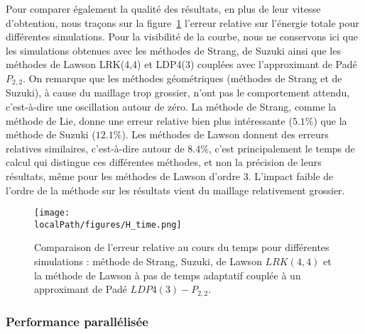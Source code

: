 Pour comparer également la qualité des résultats, en plus de leur vitesse d'obtention, nous traçons sur la figure~\ref{fig:3:H_time} l'erreur relative sur l'énergie totale pour différentes simulations. Pour la visibilité de la courbe, nous ne conservons ici que les simulations obtenues avec les méthodes de Strang, de Suzuki ainsi que les méthodes de Lawson LRK(4,4) et LDP4(3) couplées avec l'approximant de Padé $P_{2,2}$. On remarque que les méthodes géométriques (méthodes de Strang et de Suzuki), à cause du maillage trop grossier, n'ont pas le comportement attendu, c'est-à-dire une oscillation autour de zéro. La méthode de Strang, comme la méthode de Lie, donne une erreur relative bien plus intéressante ($5.1\%$) que la méthode de Suzuki ($12.1\%$). Les méthodes de Lawson donnent des erreurs relatives similaires, c'est-à-dire autour de $8.4\%$, c'est principalement le temps de calcul qui distingue ces différentes méthodes, et non la précision de leurs résultats, même pour les méthodes de Lawson d'ordre 3. L'impact faible de l'ordre de la méthode sur les résultats vient du maillage relativement grossier.

\begin{figure}
  \centering
  \texttt{[image: \\localPath/figures/H\_time.png]}
  \caption{Comparaison de l'erreur relative au cours du temps pour différentes simulations : méthode de Strang, Suzuki, de Lawson $LRK(4,4)$ et la méthode de Lawson à pas de temps adaptatif couplée à un approximant de Padé $LDP4(3)-P_{2,2}$.}
  \label{fig:3:H_time}
\end{figure}

\subsubsection{Performance parallélisée}


